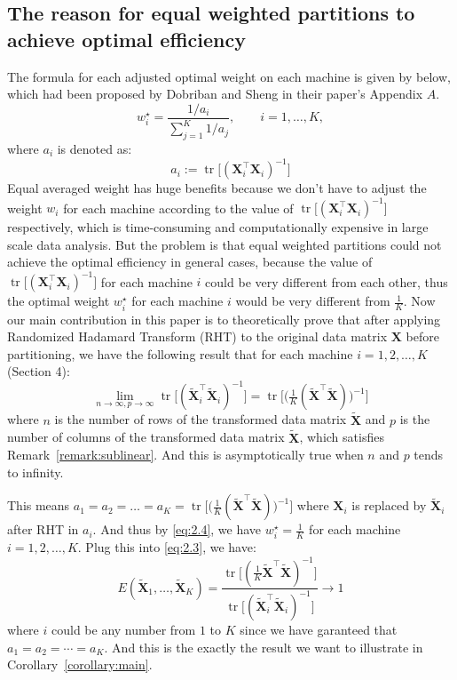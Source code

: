 \documentclass[11pt]{article}
\numberwithin{equation}{section}
\theoremstyle{plain}
\theoremstyle{definition}
\theoremstyle{remark}
\begin{document}
\subsection{The reason for equal weighted partitions to achieve optimal efficiency}
The formula for each adjusted optimal weight on each machine is given by below, which had been proposed by Dobriban and Sheng \cite{dobriban2022distributedlinearregressionaveraging} in their paper's Appendix $A$.
\[
    w_i^{\star}
      =\frac{\displaystyle 1/a_i}
         {\displaystyle\sum_{j=1}^{K}1/a_j},
      \qquad i=1,\dots,K,\tag{2.4} \label{eq:2.4}
  \]
where \(a_i\) is denoted as:
\[ 
a_i := \operatorname{tr}\!\bigl[(\mathbf{X}_i^{\top}\mathbf{X}_i)^{-1}\bigr]
\]
Equal averaged weight has huge benefits because we don't have to adjust the weight $w_i$ for each machine according to the value of $\operatorname{tr}\!\bigl[(\mathbf{X}_i^{\top}\mathbf{X}_i)^{-1}\bigr]$ respectively, which is time-consuming and computationally expensive in large scale data analysis.
But the problem is that equal weighted partitions could not achieve the optimal efficiency in general cases, because the value of $\operatorname{tr}\!\bigl[(\mathbf{X}_i^{\top}\mathbf{X}_i)^{-1}\bigr]$ for each machine $i$ could be very different from each other, thus the optimal weight $w_i^{\star}$ for each machine $i$ would be very different from $\frac{1}{K}$.
Now our main contribution in this paper is to theoretically prove that after applying Randomized Hadamard Transform (RHT) to the original data matrix $\mathbf{X}$ before partitioning, we have the following result that for each machine $i = 1,2,\ldots,K$ (Section 4):
\[
\lim_{n\to\infty,p\to\infty}\operatorname{tr}\bigl[(\tilde{\mathbf{X}}_i^{\top}\tilde{\mathbf{X}}_i)^{-1}\bigr]
  = \operatorname{tr}\bigl[\bigl(\tfrac{1}{K}(\tilde{\mathbf{X}}^{\top}\tilde{\mathbf{X}})\bigr)^{-1}\bigr] \tag{2.5} \label{eq:2.5}
\]
where $n$ is the number of rows of the transformed data matrix $\mathbf{\tilde{X}}$ and $p$ is the number of columns of the transformed data matrix $\mathbf{\tilde{X}}$, which satisfies Remark~\ref{remark:sublinear}. And this is asymptotically true when $n$ and $p$ tends to infinity.

This means $a_1 = a_2 = \ldots = a_K = \operatorname{tr}\bigl[\bigl(\tfrac{1}{K}(\tilde{\mathbf{X}}^{\top}\tilde{\mathbf{X}})\bigr)^{-1}\bigr]$ where $\mathbf{X}_i$ is replaced by $\mathbf{\tilde{X}}_i$ after RHT in $a_i$. And thus by \ref{eq:2.4}, we have $w_i^{\star} = \frac{1}{K}$ for each machine $i = 1,2,\ldots,K$. Plug this into \ref{eq:2.3}, we have:
\[
E(\mathbf{\tilde{X}}_1,\ldots,\mathbf{\tilde{X}}_K) = \frac{\operatorname{tr}\!\bigl[(\frac{1}{K}\mathbf{\tilde{X}}^{\top}\mathbf{\tilde{X}})^{-1}\bigr]} {{\operatorname{tr}\!\bigl[(\mathbf{\tilde{X}}_i^{\top}\mathbf{\tilde{X}}_i)^{-1}\bigr]}} \to 1 \tag{2.6} \label{eq:2.6}
\]
where $i$ could be any number from $1$ to $K$ since we have garanteed that \(a_1 = a_2 = \cdots = a_K\). And this is the exactly the result we want to illustrate in Corollary~\ref{corollary:main}.
\end{document}

